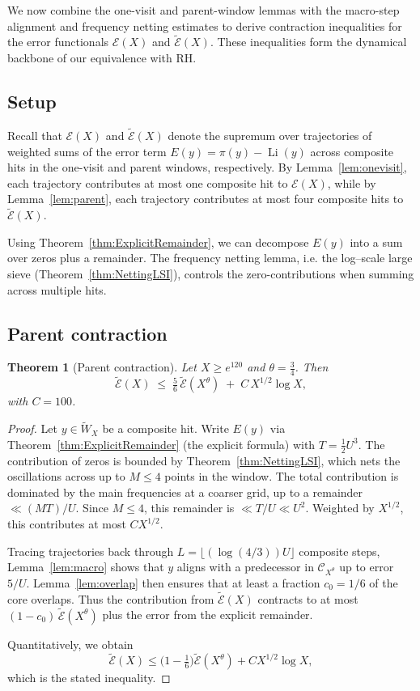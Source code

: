 \documentclass[11pt]{article}
\theoremstyle{plain}
\newtheorem{theorem}{Theorem}[section]
\theoremstyle{definition}
\theoremstyle{remark}
\begin{document}
We now combine the one-visit and parent-window lemmas with the macro-step alignment and frequency netting estimates to derive contraction inequalities for the error functionals $\mathcal E(X)$ and $\widetilde{\mathcal E}(X)$. These inequalities form the dynamical backbone of our equivalence with RH.

\subsection{Setup}

Recall that $\mathcal E(X)$ and $\widetilde{\mathcal E}(X)$ denote the supremum over trajectories of weighted sums of the error term $E(y)=\pi(y)-\operatorname{Li}(y)$ across composite hits in the one-visit and parent windows, respectively. By Lemma~\ref{lem:onevisit}, each trajectory contributes at most one composite hit to $\mathcal E(X)$, while by Lemma~\ref{lem:parent}, each trajectory contributes at most four composite hits to $\widetilde{\mathcal E}(X)$. 

Using Theorem~\ref{thm:ExplicitRemainder}, we can decompose $E(y)$ into a sum over zeros plus a remainder. The frequency netting lemma, i.e. the log–scale large sieve (Theorem~\ref{thm:NettingLSI}), controls the zero-contributions when summing across multiple hits.

\subsection{Parent contraction}

\begin{theorem}[Parent contraction]\label{thm:parent-contract}
Let $X \geq e^{120}$ and $\theta=\tfrac34$. Then
\[
\widetilde{\mathcal E}(X)\;\leq\; \tfrac{5}{6}\,\widetilde{\mathcal E}(X^\theta)\;+\; C\,X^{1/2}\log X,
\]
with $C=100$.
\end{theorem}

\begin{proof}
Let $y\in\widetilde W_X$ be a composite hit. Write $E(y)$ via Theorem~\ref{thm:ExplicitRemainder} (the explicit formula) with $T=\tfrac12 U^3$. The contribution of zeros is bounded by Theorem~\ref{thm:NettingLSI}, which nets the oscillations across up to $M\leq 4$ points in the window. The total contribution is dominated by the main frequencies at a coarser grid, up to a remainder $\ll (MT)/U$. Since $M\leq 4$, this remainder is $\ll T/U \ll U^2$. Weighted by $X^{1/2}$, this contributes at most $C X^{1/2}$.

Tracing trajectories back through $L=\lfloor (\log(4/3))U \rfloor$ composite steps, Lemma~\ref{lem:macro} shows that $y$ aligns with a predecessor in $\mathcal C_{X^\theta}$ up to error $5/U$. Lemma~\ref{lem:overlap} then ensures that at least a fraction $c_0=1/6$ of the core overlaps. Thus the contribution from $\widetilde{\mathcal E}(X)$ contracts to at most $(1-c_0)\,\widetilde{\mathcal E}(X^\theta)$ plus the error from the explicit remainder.

Quantitatively, we obtain
\[
\widetilde{\mathcal E}(X) \leq \Big(1-\tfrac16\Big)\widetilde{\mathcal E}(X^\theta) + C X^{1/2}\log X,
\]
which is the stated inequality.
\end{proof}
\end{document}
